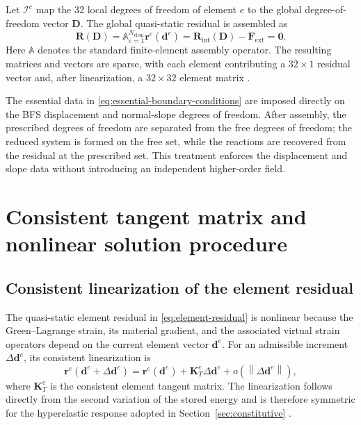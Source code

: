 \documentclass[preprint,12pt]{elsarticle}
\begin{document}
Let $\mathcal{I}^e$ map the 32 local degrees of freedom of element $e$
to the global degree-of-freedom vector $\mathbf{D}$. The global
quasi-static residual is assembled as
\begin{equation}
 \mathbf{R}(\mathbf{D})
 =\mathbb{A}_{e=1}^{N_{\mathrm{elem}}}
 \mathbf{r}^e(\mathbf{d}^e)
 =\mathbf{R}_{\mathrm{int}}(\mathbf{D})
 -\mathbf{F}_{\mathrm{ext}}
 =\mathbf{0}.
 \label{eq:global-residual}
\end{equation}
Here $\mathbb{A}$ denotes the standard finite-element assembly operator.
The resulting matrices and vectors are sparse, with each element
contributing a $32\times1$ residual vector and, after linearization, a
$32\times32$ element matrix \cite{Hughes1987,BelytschkoLiuMoran2000}.

The essential data in \eqref{eq:essential-boundary-conditions} are
imposed directly on the BFS displacement and normal-slope degrees of
freedom. After assembly, the prescribed degrees of freedom are separated
from the free degrees of freedom; the reduced system is formed on the
free set, while the reactions are recovered from the residual at the
prescribed set. This treatment enforces the displacement and slope data
without introducing an independent higher-order field.

\section{Consistent tangent matrix and nonlinear solution procedure}
\label{sec:consistent-tangent-newton}

\subsection{Consistent linearization of the element residual}
\label{sec:consistent-linearization}

The quasi-static element residual in \eqref{eq:element-residual} is
nonlinear because the Green--Lagrange strain, its material gradient, and
the associated virtual strain operators depend on the current element
vector $\mathbf{d}^e$. For an admissible increment
$\Delta\mathbf{d}^e$, its consistent linearization is
\begin{equation}
 \mathbf{r}^e\left(\mathbf{d}^e+\Delta\mathbf{d}^e\right)
 =\mathbf{r}^e\left(\mathbf{d}^e\right)
 +\mathbf{K}_T^e\Delta\mathbf{d}^e
 +o\left(\left\|\Delta\mathbf{d}^e\right\|\right),
 \label{eq:element-residual-linearization}
\end{equation}
where $\mathbf{K}_T^e$ is the consistent element tangent matrix. The
linearization follows directly from the second variation of the stored
energy and is therefore symmetric for the hyperelastic response adopted
in Section~\ref{sec:constitutive} \cite{SimoHughes1998,Holzapfel2000}.
\end{document}
